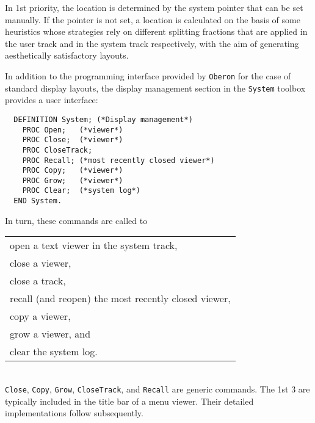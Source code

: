 In 1st priority, the location is determined by the system pointer that can be set manually.
If the pointer is not set, a location is calculated on the basis of some heuristics
whose strategies rely on different splitting fractions
that are applied in the user track and in the system track respectively,
with the aim of generating aesthetically satisfactory layouts.

In addition to the programming interface provided by \verb|Oberon|
for the case of standard display layouts,
the display management section in the \verb|System| toolbox provides a user interface:
\begin{verbatim}
  DEFINITION System; (*Display management*)
    PROC Open;   (*viewer*)
    PROC Close;  (*viewer*)
    PROC CloseTrack;
    PROC Recall; (*most recently closed viewer*)
    PROC Copy;   (*viewer*)
    PROC Grow;   (*viewer*)
    PROC Clear;  (*system log*)
  END System.
\end{verbatim}
In turn, these commands are called to
\begin{table}[h!]
  \centering
  \begin{tabular}{l}
    open a text viewer in the system track, \\
    close a viewer, \\
    close a track, \\
    recall (and reopen) the most recently closed viewer, \\
    copy a viewer, \\
    grow a viewer, and \\
    clear the system log.
  \end{tabular}
\end{table}
\\\verb|Close|, \verb|Copy|, \verb|Grow|, \verb|CloseTrack|, and \verb|Recall| are generic commands.
The 1st 3 are typically included in the title bar of a menu viewer.
Their detailed implementations follow subsequently.
